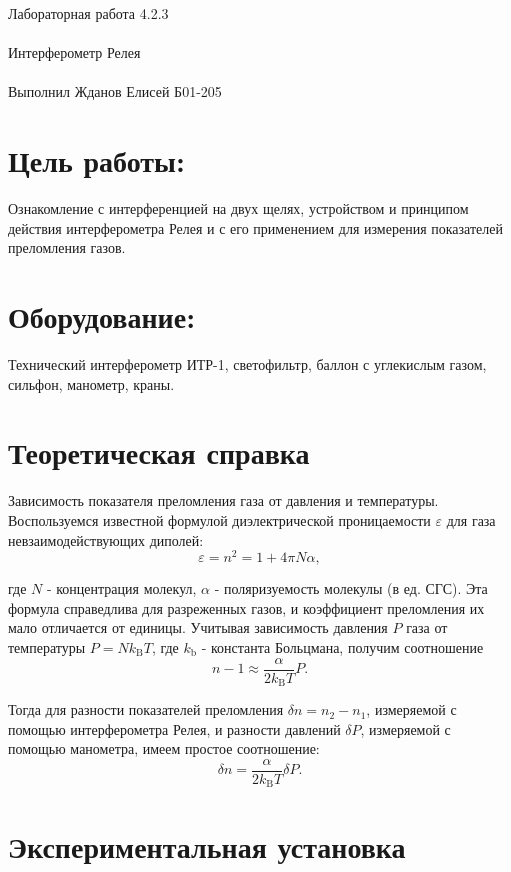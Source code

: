 \documentclass{astroedu-lab}
\begin{document}
\pagestyle{plain}

\begin{problem}{\huge Лабораторная работа 4.2.3\\\\Интерферометр Релея\\\\Выполнил Жданов Елисей Б01-205}

\section{Цель работы:}

Ознакомление с интерференцией на двух щелях,
устройством и принципом действия интерферометра Релея и с его
применением для измерения показателей преломления газов.


\section{Оборудование:}

Технический интерферометр ИТР-1, светофильтр, баллон с углекислым газом, сильфон, манометр, краны.

\section{Теоретическая справка}

Зависимость показателя преломления газа от давления и температуры. Воспользуемся известной формулой диэлектрической проницаемости $\varepsilon$ для газа невзаимодействующих диполей:
$$
\varepsilon=n^2=1+4 \pi N \alpha,
$$

где $N$ - концентрация молекул, $\alpha$ - поляризуемость молекулы (в ед. СГС). Эта формула справедлива для разреженных газов, и коэффициент преломления их мало отличается от единицы. Учитывая зависимость давления $P$ газа от температуры $P=N k_{\mathrm{B}} T$, где $k_{\mathrm{b}}$ - константа Больцмана, получим соотношение
$$
n-1 \approx \frac{\alpha}{2 k_{\mathrm{B}} T} P .
$$

Тогда для разности показателей преломления $\delta n=n_2-n_1$, измеряемой с помощью интерферометра Релея, и разности давлений $\delta P$, измеряемой с помощью манометра, имеем простое соотношение:
$$
\delta n=\frac{\alpha}{2 k_{\mathrm{B}} T} \delta P .
$$

\section{Экспериментальная установка}


\end{problem}
\end{document}
